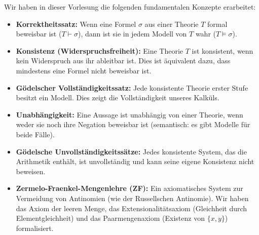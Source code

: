 \begin{nice-box}
Wir haben in dieser Vorlesung die folgenden fundamentalen Konzepte erarbeitet:
\begin{itemize}
    \item \textbf{Korrektheitssatz:} Wenn eine Formel $\sigma$ aus einer Theorie $T$ formal beweisbar ist ($T \vdash \sigma$), dann ist sie in jedem Modell von $T$ wahr ($T \models \sigma$).
    \item \textbf{Konsistenz (Widerspruchsfreiheit):} Eine Theorie $T$ ist konsistent, wenn kein Widerspruch aus ihr ableitbar ist. Dies ist äquivalent dazu, dass mindestens eine Formel nicht beweisbar ist.
    \item \textbf{Gödelscher Vollständigkeitssatz:} Jede konsistente Theorie erster Stufe besitzt ein Modell. Dies zeigt die Vollständigkeit unseres Kalküls.
    \item \textbf{Unabhängigkeit:} Eine Aussage ist unabhängig von einer Theorie, wenn weder sie noch ihre Negation beweisbar ist (semantisch: es gibt Modelle für beide Fälle).
    \item \textbf{Gödelsche Unvollständigkeitssätze:} Jedes konsistente System, das die Arithmetik enthält, ist unvollständig und kann seine eigene Konsistenz nicht beweisen.
    \item \textbf{Zermelo-Fraenkel-Mengenlehre (ZF):} Ein axiomatisches System zur Vermeidung von Antinomien (wie der Russellschen Antinomie). Wir haben das Axiom der leeren Menge, das Extensionalitätsaxiom (Gleichheit durch Elementgleichheit) und das Paarmengenaxiom (Existenz von $\{x,y\}$) formalisiert.
\end{itemize}
\end{nice-box}

